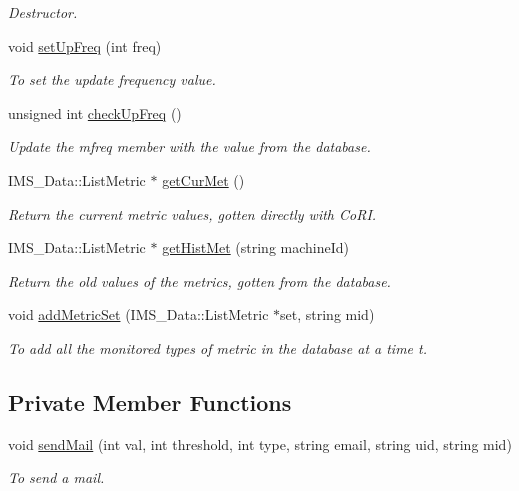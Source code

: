 \begin{DoxyCompactItemize}
\begin{DoxyCompactList}\small\item\em Destructor. \item\end{DoxyCompactList}\item 
void \hyperlink{classMetricServer_adfea7bbb8ea22a861bf6f7652075f35b}{setUpFreq} (int freq)
\begin{DoxyCompactList}\small\item\em To set the update frequency value. \item\end{DoxyCompactList}\item 
unsigned int \hyperlink{classMetricServer_ae6f1cc4eda630823029dc6161f5bcd3e}{checkUpFreq} ()
\begin{DoxyCompactList}\small\item\em Update the mfreq member with the value from the database. \item\end{DoxyCompactList}\item 
IMS\_\-Data::ListMetric $\ast$ \hyperlink{classMetricServer_a0daa76199b933f12617c7088ef1295e8}{getCurMet} ()
\begin{DoxyCompactList}\small\item\em Return the current metric values, gotten directly with CoRI. \item\end{DoxyCompactList}\item 
IMS\_\-Data::ListMetric $\ast$ \hyperlink{classMetricServer_afcb928edb891800c34a5fda3cae4abe3}{getHistMet} (string machineId)
\begin{DoxyCompactList}\small\item\em Return the old values of the metrics, gotten from the database. \item\end{DoxyCompactList}\item 
void \hyperlink{classMetricServer_ad84b869bee5b7d1890c54fbf778b0ee1}{addMetricSet} (IMS\_\-Data::ListMetric $\ast$set, string mid)
\begin{DoxyCompactList}\small\item\em To add all the monitored types of metric in the database at a time t. \item\end{DoxyCompactList}\end{DoxyCompactItemize}
\subsection*{Private Member Functions}
\begin{DoxyCompactItemize}
\item 
void \hyperlink{classMetricServer_a4163ec4b6d279051877af2d3694151f6}{sendMail} (int val, int threshold, int type, string email, string uid, string mid)
\begin{DoxyCompactList}\small\item\em To send a mail. \item\end{DoxyCompactList}\end{DoxyCompactItemize}
